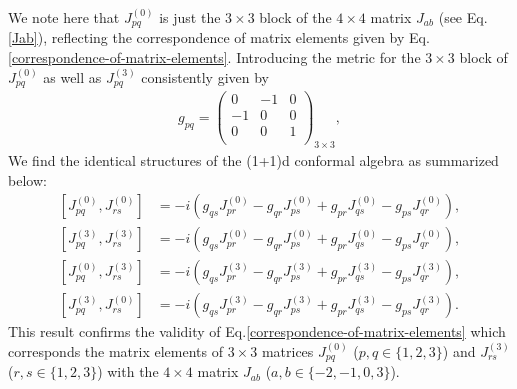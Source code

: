 \documentclass[%
 reprint,
superscriptaddress,
 amsmath,amssymb,
 aps,
]{revtex4-2}
\begin{document}
We note here that $J^{(0)}_{p q}$ is just the $3\times3$ block of the $4\times4$ matrix $J_{ab}$ (see Eq.\eqref{Jab}), reflecting the correspondence of matrix elements given by Eq.\eqref{correspondence-of-matrix-elements}.   
Introducing the metric for the $3\times3$ block of $J^{(0)}_{p q}$ as well as $J^{(3)}_{p q}$ consistently given by   
\begin{align}
      g_{pq}=\begin{pmatrix}
  0&-1&0\\
  -1&0&0\\
  0&0&1\\
  \end{pmatrix}_{3\times3},
  \end{align}
We find the identical structures of the (1+1)d conformal algebra
as summarized below:
\begin{align}
      \left[J^{(0)}_{{p}{q}},J^{(0)}_{{r}{s}}\right]&=-i\left(g_{{q}{s}}J^{(0)}_{{p}{r}}-g_{{q}{r}}J^{(0)}_{{p}{s}}+g_{{p}{r}}J^{(0)}_{{q}{s}}-g_{{p}{s}}J^{(0)}_{{q}{r}}\right),\label{algebraJpq1}\\
      \left[J^{(3)}_{{p}{q}},J^{(3)}_{{r}{s}}\right]&=-i\left(g_{{q}{s}}J^{(0)}_{{p}{r}}-g_{{q}{r}}J^{(0)}_{{p}{s}}+g_{{p}{r}}J^{(0)}_{{q}{s}}-g_{{p}{s}}J^{(0)}_{{q}{r}}\right),\label{algebraJpq2}\\
      \left[J^{(0)}_{{p}{q}},J^{(3)}_{{r}{s}}\right]&=-i\left(g_{{q}{s}}J^{(3)}_{{p}{r}}-g_{{q}{r}}J^{(3)}_{{p}{s}}+g_{{p}{r}}J^{(3)}_{{q}{s}}-g_{{p}{s}}J^{(3)}_{{q}{r}}\right),\label{algebraJpq3}\\
      \left[J^{(3)}_{{p}{q}},J^{(0)}_{{r}{s}}\right]&=-i\left(g_{{q}{s}}J^{(3)}_{{p}{r}}-g_{{q}{r}}J^{(3)}_{{p}{s}}+g_{{p}{r}}J^{(3)}_{{q}{s}}-g_{{p}{s}}J^{(3)}_{{q}{r}}\right)\label{algebraJpq4}.
  \end{align}
This result confirms the validity of Eq.\eqref{correspondence-of-matrix-elements} which corresponds the matrix elements of $3\times3$ matrices
 $J^{(0)}_{pq}$ ($p,q\in\{1,2,3\}$) and $J^{(3)}_{rs}$ ($r,s\in\{1,2,3\}$) with the $4\times4$ matrix $J_{ab}$ ($a,b\in\{-2,-1,0,3\}$).
\end{document}
